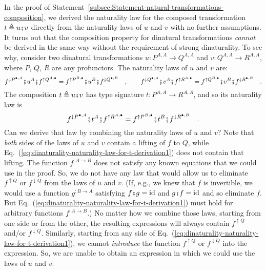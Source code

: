 In the proof of Statement~\ref{subsec:Statement-natural-transformations-composition},
we derived the naturality law for the composed transformation $t\triangleq u\bef v$
directly from the naturality laws of $u$ and $v$ with no further
assumptions. It turns out that the composition property for dinatural
transformations \emph{cannot} be derived in the same way without the
requirement of strong dinaturality. To see why, consider two dinatural
transformations $u:P^{A,A}\rightarrow Q^{A,A}$ and $v:Q^{A,A}\rightarrow R^{A,A}$,
where $P$, $Q$, $R$ are any profunctors. The naturality laws of
$u$ and $v$ are:
\[
f^{\downarrow P^{\bullet,A}}\bef u^{A}\bef f^{\uparrow Q^{A,\bullet}}=f^{\uparrow P^{B,\bullet}}\bef u^{B}\bef f^{\downarrow Q^{\bullet,B}}\quad,\quad\quad f^{\downarrow Q^{\bullet,A}}\bef v^{A}\bef f^{\uparrow R^{A,\bullet}}=f^{\uparrow Q^{B,\bullet}}\bef v^{B}\bef f^{\downarrow R^{\bullet,B}}\quad.
\]
 The composition $t\triangleq u\bef v$ has type signature $t:P^{A,A}\rightarrow R^{A,A}$,
and so its naturality law is
\begin{equation}
f^{\downarrow P^{\bullet,A}}\bef t^{A}\bef f^{\uparrow R^{A,\bullet}}=f^{\uparrow P^{B,\bullet}}\bef t^{B}\bef f^{\downarrow R^{\bullet,B}}\quad.\label{eq:dinaturality-naturality-law-for-t-derivation1}
\end{equation}
Can we derive that law by combining the naturality laws of $u$ and
$v$? Note that \emph{both} sides of the laws of $u$ and $v$ contain
a lifting of $f$ to $Q$, while Eq.~(\ref{eq:dinaturality-naturality-law-for-t-derivation1})
does not contain that lifting. The function $f^{:A\rightarrow B}$
does not satisfy any known equations that we could use in the proof.
So, we do not have any law that would allow us to eliminate $f^{\uparrow Q}$
or $f^{\downarrow Q}$ from the laws of $u$ and $v$. (If, e.g.,
we knew that $f$ is invertible, we would use a function $g^{:B\rightarrow A}$
satisfying $f\bef g=\text{id}$ and $g\bef f=\text{id}$ and so eliminate
$f$. But Eq.~(\ref{eq:dinaturality-naturality-law-for-t-derivation1})
must hold for arbitrary functions $f^{:A\rightarrow B}$.) No matter
how we combine those laws, starting from one side or from the other,
the resulting expressions will always contain $f^{\uparrow Q}$ and/or
$f^{\downarrow Q}$. Similarly, starting from any side of Eq.~(\ref{eq:dinaturality-naturality-law-for-t-derivation1}),
we cannot \emph{introduce} the function $f^{\uparrow Q}$ or $f^{\downarrow Q}$
into the expression. So, we are unable to obtain an expression in
which we could use the laws of $u$ and $v$. 

